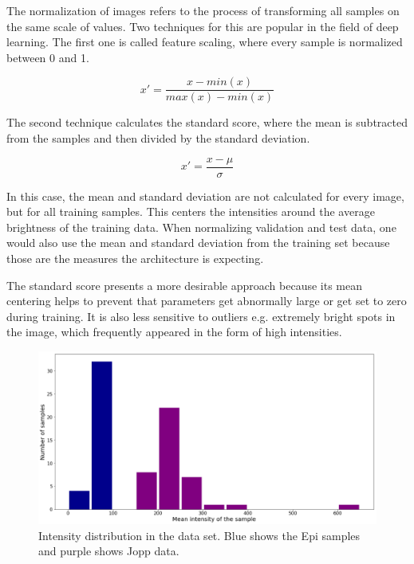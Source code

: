 The normalization of images refers to the process of transforming all samples on the same scale of values. Two techniques for this are popular in the field of deep learning. The first one is called feature scaling, where every sample is normalized between 0 and 1.

\begin{figure}[H]
\[x' = \frac {x - min(x)}{max(x) - min(x)}\]
\end{figure}

The second technique calculates the standard score, where the mean is subtracted from the samples and then divided by the standard deviation.

\begin{figure}[H]
\[x' = \frac {x - \mu}{\sigma}\]
\end{figure}

In this case, the mean and standard deviation are not calculated for every image, but for all training samples. This centers the intensities around the average brightness of the training data. When normalizing validation and test data, one would also use the mean and standard deviation from the training set because those are the measures the architecture is expecting.

The standard score presents a more desirable approach because its mean centering helps to prevent that parameters get abnormally large or get set to zero during training. It is also less sensitive to outliers e.g. extremely bright spots in the image, which frequently appeared in the form of high intensities.

\begin{figure}[H]
\centering
\par
\includegraphics[width=1.0\textwidth]{imgs/intensity_distr.png}
\caption{Intensity distribution in the data set. Blue shows the Epi samples and purple shows Jopp data.}
\par
\end{figure}

